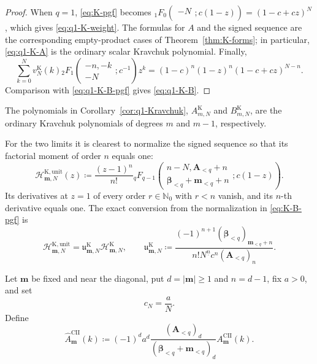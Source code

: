 \documentclass[10pt]{amsart}
\newcommand{\Nzero}{\mathbb N_0}
\newcommand{\A}{\boldsymbol A}
\newcommand{\bbeta}{\boldsymbol\beta}
\newcommand{\mm}{\boldsymbol m}
\newcommand{\abs}[1]{\lvert#1\rvert}
\newcommand{\fall}[2]{#1^{\underline{#2}}}
\newcommand{\pFq}[5]{{}_{#1}F_{#2}\!\left(\begin{matrix}#3\\#4\end{matrix};#5\right)}
\theoremstyle{plain}
\theoremstyle{definition}
\theoremstyle{remark}
\begin{document}
\begin{proof}
When \(q=1\), \eqref{eq:K-pgf} becomes
\(\pFq{1}{0}{-N}{}{c(1-z)}=(1-c+cz)^N\), which gives
\eqref{eq:q1-K-weight}. The formulas for \(A\) and the signed
sequence are the corresponding empty-product cases of
Theorem~\ref{thm:K-forms}; in particular, \eqref{eq:q1-K-A} is the
ordinary scalar Kravchuk polynomial. Finally,
\[
 \sum_{k=0}^Nv_N^{\mathrm K}(k)
 \pFq{2}{1}{-n,-k}{-N}{c^{-1}}z^k
 =
 (1-c)^n(1-z)^n(1-c+cz)^{N-n}.
\]
Comparison with \eqref{eq:q1-K-B-pgf} gives \eqref{eq:q1-K-B}.
\end{proof}

The polynomials in Corollary~\ref{cor:q1-Kravchuk},
\(A_{m,N}^{\mathrm K}\) and \(B_{m,N}^{\mathrm K}\), are the ordinary
Kravchuk polynomials of degrees \(m\) and \(m-1\), respectively.

For the two limits it is clearest to normalize the signed sequence so that
its factorial moment of order \(n\) equals one:
\begin{equation}
 \mathcal H_{\mm,N}^{\mathrm K,\mathrm{unit}}(z)
 \coloneq
 \frac{(z-1)^n}{n!}
 \pFq{q}{q-1}
 {n-N,\A_{<q}+n}
 {\bbeta_{<q}+\mm_{<q}+n}
 {c(1-z)}.
 \label{eq:K-unit-B}
\end{equation}
Its derivatives at \(z=1\) of every order \(r\in\Nzero\) with \(r<n\) vanish, and its
\(n\)-th derivative equals one.
The exact conversion from the normalization in \eqref{eq:K-B-pgf} is
\begin{equation}
 \mathcal H_{\mm,N}^{\mathrm K,\mathrm{unit}}
 =\mathfrak u_{\mm,N}^{\mathrm K}\mathcal H_{\mm,N}^{\mathrm K},
 \qquad
 \mathfrak u_{\mm,N}^{\mathrm K}
 \coloneq
 \frac{(-1)^{n+1}(\bbeta_{<q})_{\mm_{<q}+n}}
 {n!\fall{N}{n}c^n(\A_{<q})_n}.
 \label{eq:K-unit-normalizing-factor}
\end{equation}

Let \(\mm\) be fixed and near the diagonal, put
\(d=\abs\mm\ge1\) and \(n=d-1\), fix \(a>0\), and set
\begin{equation}
 c_N=\frac aN.
 \label{eq:K-CII-scaling}
\end{equation}
Define
\[
 \widehat A_{\mm}^{\mathrm{CII}}(k)
 \coloneq(-1)^da^d
 \frac{(\A_{<q})_d}{(\bbeta_{<q}+\mm_{<q})_d}
 A_{\mm}^{\mathrm{CII}}(k).
\]
\end{document}
